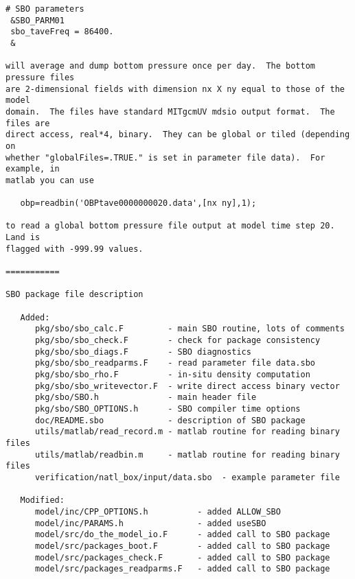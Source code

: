 \begin{verbatim}
# SBO parameters
 &SBO_PARM01
 sbo_taveFreq = 86400.
 &

will average and dump bottom pressure once per day.  The bottom pressure files
are 2-dimensional fields with dimension nx X ny equal to those of the model
domain.  The files have standard MITgcmUV mdsio output format.  The files are
direct access, real*4, binary.  They can be global or tiled (depending on
whether "globalFiles=.TRUE." is set in parameter file data).  For example, in
matlab you can use

   obp=readbin('OBPtave0000000020.data',[nx ny],1);

to read a global bottom pressure file output at model time step 20.  Land is
flagged with -999.99 values.

===========

SBO package file description

   Added:
      pkg/sbo/sbo_calc.F         - main SBO routine, lots of comments
      pkg/sbo/sbo_check.F        - check for package consistency
      pkg/sbo/sbo_diags.F        - SBO diagnostics
      pkg/sbo/sbo_readparms.F    - read parameter file data.sbo
      pkg/sbo/sbo_rho.F          - in-situ density computation
      pkg/sbo/sbo_writevector.F  - write direct access binary vector
      pkg/sbo/SBO.h              - main header file
      pkg/sbo/SBO_OPTIONS.h      - SBO compiler time options
      doc/README.sbo             - description of SBO package
      utils/matlab/read_record.m - matlab routine for reading binary files
      utils/matlab/readbin.m     - matlab routine for reading binary files
      verification/natl_box/input/data.sbo  - example parameter file

   Modified:
      model/inc/CPP_OPTIONS.h          - added ALLOW_SBO
      model/inc/PARAMS.h               - added useSBO
      model/src/do_the_model_io.F      - added call to SBO package
      model/src/packages_boot.F        - added call to SBO package
      model/src/packages_check.F       - added call to SBO package
      model/src/packages_readparms.F   - added call to SBO package
\end{verbatim}
